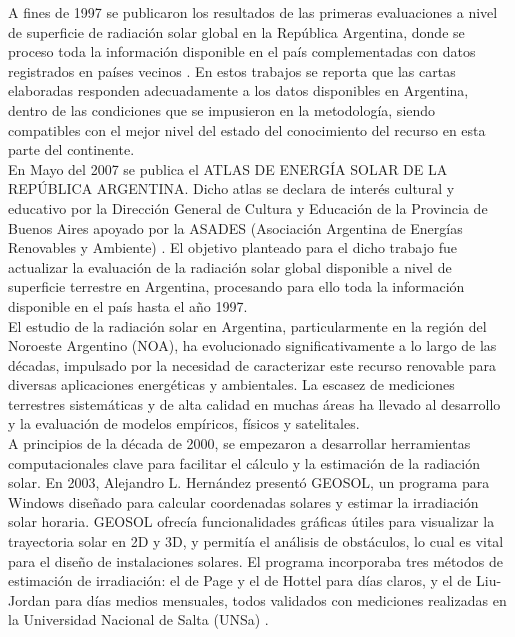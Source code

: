 A fines de 1997 se publicaron los resultados de las primeras evaluaciones a nivel de superficie de radiación solar global en la República Argentina, donde se proceso toda la información disponible en el país complementadas con datos registrados en países vecinos \citep{GrossiGallegos1998B}. En estos trabajos se reporta que  las cartas elaboradas responden adecuadamente a los datos  disponibles en Argentina, dentro de las condiciones que se impusieron en la metodología, siendo compatibles con el mejor nivel del estado del conocimiento del recurso en esta parte del continente.\\


En Mayo del 2007 se publica el ATLAS DE ENERGÍA SOLAR DE LA REPÚBLICA ARGENTINA. Dicho atlas se declara de interés cultural y educativo por la Dirección General de Cultura y Educación de la Provincia de Buenos Aires apoyado por la ASADES (Asociación Argentina de Energías Renovables y Ambiente) \citep{GrossiRighini2007}. El objetivo planteado para el dicho trabajo fue actualizar la evaluación de la radiación solar global disponible a nivel de superficie terrestre en Argentina, procesando para ello toda la información disponible en el país hasta el año 1997.\\


El estudio de la radiación solar en Argentina, particularmente en la región del Noroeste Argentino (NOA), ha evolucionado significativamente a lo largo de las décadas, impulsado por la necesidad de caracterizar este recurso renovable para diversas aplicaciones energéticas y ambientales. La escasez de mediciones terrestres sistemáticas y de alta calidad en muchas áreas ha llevado al desarrollo y la evaluación de modelos empíricos, físicos y satelitales.\\

A principios de la década de 2000, se empezaron a desarrollar herramientas computacionales clave para facilitar el cálculo y la estimación de la radiación solar. En 2003, Alejandro L. Hernández presentó GEOSOL, un programa para Windows diseñado para calcular coordenadas solares y estimar la irradiación solar horaria. GEOSOL ofrecía funcionalidades gráficas útiles para visualizar la trayectoria solar en 2D y 3D, y permitía el análisis de obstáculos, lo cual es vital para el diseño de instalaciones solares. El programa incorporaba tres métodos de estimación de irradiación: el de Page y el de Hottel \citep{Hottel1976} para días claros, y el de Liu-Jordan \citep{Liu1960}  para días medios mensuales, todos validados con mediciones realizadas en la Universidad Nacional de Salta (UNSa) \citep{Hernandez2003}.\\

